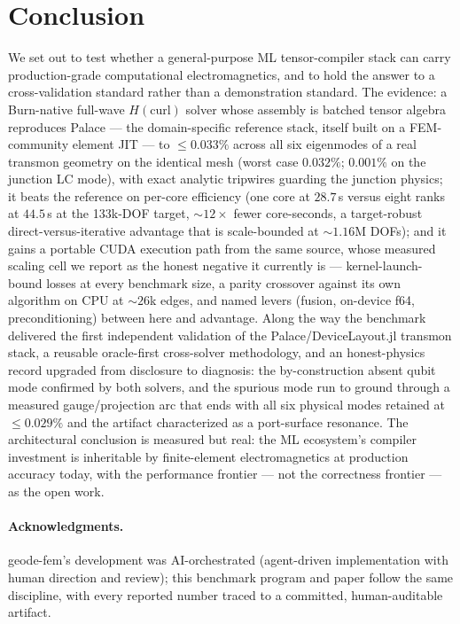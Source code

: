 \documentclass{anvil-paper}
\begin{document}
\section{Conclusion}
\label{sec:conclusion}

We set out to test whether a general-purpose ML tensor-compiler stack can
carry production-grade computational electromagnetics, and to hold the
answer to a cross-validation standard rather than a demonstration
standard. The evidence: a Burn-native full-wave $H(\mathrm{curl})$ solver
whose assembly is batched tensor algebra reproduces Palace --- the
domain-specific reference stack, itself built on a FEM-community element
JIT --- to $\leq 0.033\%$ across all six eigenmodes of a real transmon
geometry on the identical mesh (worst case $0.032\%$; $0.001\%$ on the
junction LC mode), with exact analytic tripwires guarding the junction
physics; it beats the reference on per-core efficiency (one core at $28.7$\,s
versus eight ranks at $44.5$\,s at the 133k-DOF target, ${\sim}12\times$
fewer core-seconds, a target-robust direct-versus-iterative advantage that
is scale-bounded at ${\sim}1.16$M DOFs); and it gains a portable CUDA execution path from the same
source, whose measured scaling cell we report as the honest negative it
currently is --- kernel-launch-bound losses at every benchmark size, a
parity crossover against its own algorithm on CPU at ${\sim}26$k edges,
and named levers (fusion, on-device f64, preconditioning) between here
and advantage. Along the way the benchmark delivered the first
independent validation of the Palace/DeviceLayout.jl transmon stack, a
reusable oracle-first cross-solver methodology, and an honest-physics
record upgraded from disclosure to diagnosis: the by-construction absent
qubit mode confirmed by both solvers, and the spurious mode run to ground
through a measured gauge/projection arc that ends with all six physical
modes retained at $\leq 0.029\%$ and the artifact characterized as a
port-surface resonance. The architectural conclusion is measured but
real: the ML ecosystem's compiler investment is inheritable by
finite-element electromagnetics at production accuracy today, with the
performance frontier --- not the correctness frontier --- as the open
work.

\paragraph{Acknowledgments.}
geode-fem's development was AI-orchestrated (agent-driven implementation
with human direction and review); this benchmark program and paper follow
the same discipline, with every reported number traced to a committed,
human-auditable artifact.



\end{document}
